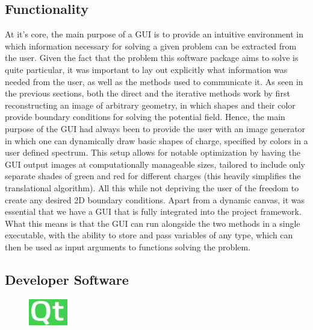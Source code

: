 \documentclass[a4paper]{article}
\begin{document}
\subsection*{Functionality}
\noindent
At it's core, the main purpose of a GUI is to provide an intuitive environment in which information necessary for solving a given problem can be extracted from the user. Given the fact that the problem this software package aims to solve is quite particular, it was important to lay out explicitly what information was needed from the user, as well as the methods used to communicate it.
\newline
\newline
\noindent
As seen in the previous sections, both the direct and the iterative methods work by first reconstructing an image of arbitrary geometry, in which shapes and their color provide boundary conditions for solving the potential field. Hence, the main purpose of the GUI had always been to provide the user with an image generator in which one can dynamically draw basic shapes of charge, specified by colors in a user defined spectrum. This setup allows for notable optimization by having the GUI output images at computationally manageable sizes, tailored to include only separate shades of green and red for different charges (this heavily simplifies the translational algorithm). All this while not depriving the user of the freedom to create any desired 2D boundary conditions.
\newline
\newline
Apart from a dynamic canvas, it was essential that we have a GUI that is fully integrated into the project framework. What this means is that the GUI can run alongside the two methods in a single executable, with the ability to store and pass variables of any type, which can then be used as input arguments to functions solving the problem. 

\subsection*{Developer Software}

\begin{figure}
  \centering
  {\includegraphics[width=0.15\textwidth]{QtPic}\label{fig:Qt}}
  \hfill
\end{figure}
\end{document}
